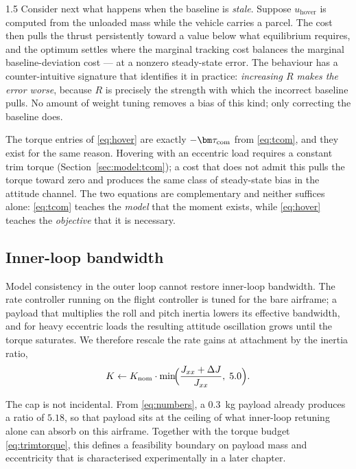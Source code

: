 \begin{spacing}{1.5}
Consider next what happens when the baseline is \emph{stale}. Suppose
$u_{\mathrm{hover}}$ is computed from the unloaded mass while the vehicle
carries a parcel. The cost then pulls the thrust persistently toward a
value below what equilibrium requires, and the optimum settles where the
marginal tracking cost balances the marginal baseline-deviation cost ---
at a nonzero steady-state error. The behaviour has a counter-intuitive
signature that identifies it in practice: \emph{increasing $R$ makes the
error worse}, because $R$ is precisely the strength with which the
incorrect baseline pulls. No amount of weight tuning removes a bias of
this kind; only correcting the baseline does.

The torque entries of \eqref{eq:hover} are exactly $-\tcom$ from
\eqref{eq:tcom}, and they exist for the same reason. Hovering with an
eccentric load requires a constant trim torque
(Section~\ref{sec:model:tcom}); a cost that does not admit this pulls the
torque toward zero and produces the same class of steady-state bias in
the attitude channel. The two equations are complementary and neither
suffices alone: \eqref{eq:tcom} teaches the \emph{model} that the moment
exists, while \eqref{eq:hover} teaches the \emph{objective} that it is
necessary.

\subsection{Inner-loop bandwidth}\label{sec:model:gain}

Model consistency in the outer loop cannot restore inner-loop bandwidth.
The rate controller running on the flight controller is tuned for the
bare airframe; a payload that multiplies the roll and pitch inertia
lowers its effective bandwidth, and for heavy eccentric loads the
resulting attitude oscillation grows until the torque saturates. We
therefore rescale the rate gains at attachment by the inertia ratio,
\begin{equation}
K \leftarrow K_{\mathrm{nom}} \cdot
\min\!\Bigl( \frac{J_{xx} + \Delta J}{J_{xx}},\; 5.0 \Bigr).
\label{eq:gain}
\end{equation}

The cap is not incidental. From \eqref{eq:numbers}, a \SI{0.3}{\kg}
payload already produces a ratio of $5.18$, so that payload sits at the
ceiling of what inner-loop retuning alone can absorb on this airframe.
Together with the torque budget \eqref{eq:trimtorque}, this defines a
feasibility boundary on payload mass and eccentricity that is
characterised experimentally in a later chapter.


\end{spacing}

